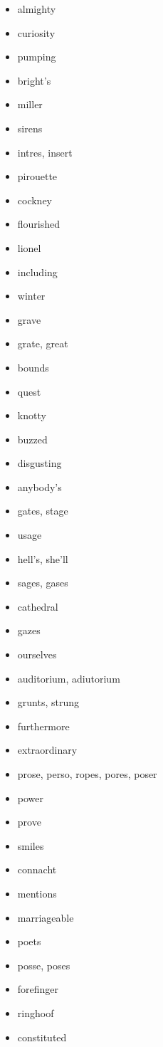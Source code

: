 \documentclass{article}
\begin{document}
\begin{itemize}
    \item almighty
    \item curiosity
    \item pumping
    \item bright's
    \item miller
    \item sirens
    \item intres, insert
    \item pirouette
    \item cockney
    \item flourished
    \item lionel
    \item including
    \item winter
    \item grave
    \item grate, great
    \item bounds
    \item quest
    \item knotty
    \item buzzed
    \item disgusting
    \item anybody's
    \item gates, stage
    \item usage
    \item hell's, she'll
    \item sages, gases
    \item cathedral
    \item gazes
    \item ourselves
    \item auditorium, adiutorium
    \item grunts, strung
    \item furthermore
    \item extraordinary
    \item prose, perso, ropes, pores, poser
    \item power
    \item prove
    \item smiles
    \item connacht
    \item mentions
    \item marriageable
    \item poets
    \item posse, poses
    \item forefinger
    \item ringhoof
    \item constituted

\end{itemize}
\end{document}
